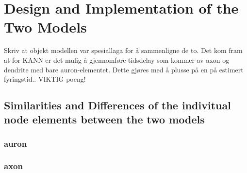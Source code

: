 \section{Design and Implementation of the Two Models}


	Skriv at objekt modellen var spesiallaga for å sammenligne de to. Det kom fram at for KANN er det mulig å gjennomføre tidsdelay som kommer av axon og dendrite med bare auron-elementet.
	Dette gjøres med å plusse på en på estimert fyringstid.. VIKTIG poeng!
	\subsection{Similarities and Differences of the indivitual node elements between the two models}
		\subsubsection{auron}
		\subsubsection{axon}
